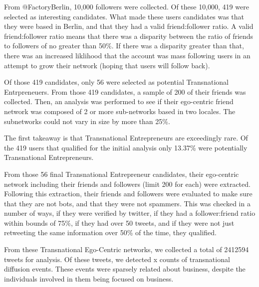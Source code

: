 From @FactoryBerlin, 10,000 followers were collected. Of these 10,000,
419 were selected as interesting candidates. What made these users
candidates was that they were based in Berlin, and that they had
a valid friend:follower ratio. A valid friend:follower ratio means
that there was a disparity between the ratio of friends to followers
of no greater than 50\%. If there was a disparity greater than that,
there was an increased liklihood that the account was mass following
users in an attempt to grow their network (hoping that users will follow
back).

Of those 419 candidates, only 56 were selected as potential Transnational
Entrpreneuers. From those 419 candidates, a sample of 200 of their friends
was collected. Then, an analysis was performed to see if their ego-centric
friend network was composed of 2 or more sub-networks based in two locales.
The subnetworks could not vary in size by more than 25\%.

The first takeaway is that Transnational Entrepreneurs are exceedingly
rare. Of the 419 users that qualified for the initial analysis only
13.37\% were potentially Transnational Entrepreneurs.

From those 56 final Transnational Entrepreneur candidates, their
ego-centric network including their friends and followers (limit 200
for each) were extracted. Following this extraction, their friends and
followers were evaluated to make sure that they are not bots, and that
they were not spammers. This was checked in a number of ways, if they
were verified by twitter, if they had a follower:friend ratio within
bounds of 75\%, if they had over 50 tweets, and if they were not just
retweeting the same information over 50\% of the time, they qualified.

From these Transnational Ego-Centric networks, we collected a total of
2412594 tweets for analysis. Of these tweets, we detected x counts of
transnational diffusion events. These events were sparsely related
about business, despite the individuals involved in them being focused
on business.

